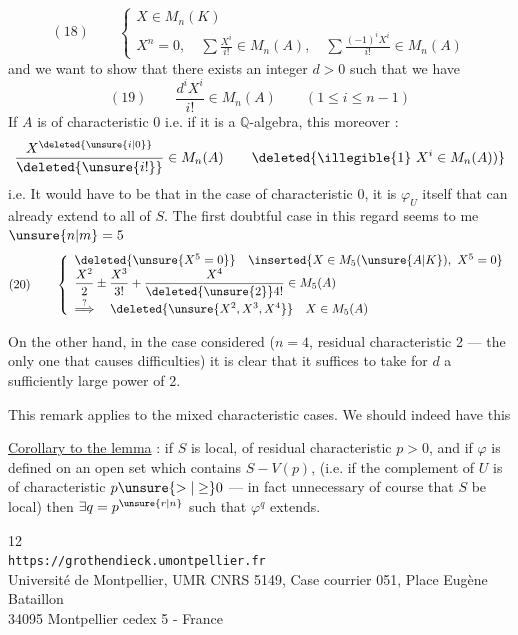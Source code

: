 \[
(18)\qquad
\left\{\begin{array}{l}
X\in M_n(K)\\
X^n=0,\quad\displaystyle\sum\frac{X^i}{i!}\in M_n(A),\quad
\displaystyle\sum\frac{(-1)^iX^i}{i!}\in M_n(A)
\end{array}\right.
\]
and we want to show that there exists an integer $d>0$ such that we have
\[
(19)\qquad\frac{d^iX^i}{i!}\in M_n(A)\qquad(1\leq i\leq n-1)
\]
If $A$ is of characteristic 0 i.e. if it is a $\mathbb Q$-algebra, this   moreover :
\[
\frac{X^{\deleted{\unsure{i|0}}}}{\deleted{\unsure{i!}}}\in M_n(A)
\qquad\deleted{\text{\illegible{1}}\ X^i\in M_n(A))}
\]
i.e. It would have to be that in the case of characteristic 0, it is $\varphi_U$ itself that can already extend to all of $S$. The first doubtful case in this regard seems to me $\unsure{n|m}=5$
\[
(20)\qquad\left\{\begin{array}{l}
\deleted{\unsure{X^5=0}}\quad\inserted{X\in M_5(\unsure{A|K}),\ X^5=0}\\
\displaystyle\frac{X^2}{2}\pm\frac{X^3}{3!}+\frac{X^4}{\deleted{\unsure{2}}4!}\in M_5(A)\\[3pt]
\overset{?}{\Longrightarrow}\quad\deleted{\unsure{X^2,X^3,X^4}}\quad X\in M_5(A)
\end{array}\right.
\]

On the other hand, in the case considered  ($n=4$, residual characteristic 2 --- the only one that causes difficulties) it is clear that it suffices to take for $d$ a sufficiently large power of 2.

This remark applies to the mixed characteristic cases. We should indeed have this

\uline{Corollary to the lemma}  : if $S$ is local, of residual characteristic $p>0$, and if $\varphi$ is defined on an open set which contains $S-V(p)$, (i.e. if the complement of $U$ is of characteristic $p\unsure{>|\geq}0$ --- in fact unnecessary of course that $S$ be local) then $\exists q=p^{\unsure{r|n}}$ such that $\varphi^q$ extends.

\begin{center}
\small
12\\
\texttt{https://grothendieck.umontpellier.fr}\\
Université de Montpellier, UMR CNRS 5149, Case courrier 051, Place Eugène Bataillon\\
34095 Montpellier cedex 5 - France
\end{center}